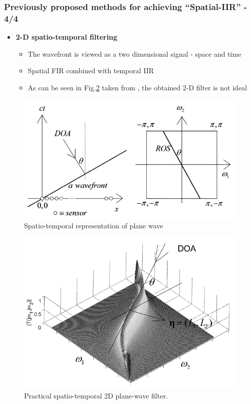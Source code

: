 \documentclass[10pt,pdflatex,headrule,landscape]{beamer}
\begin{document}
\begin{frame}
\frametitle{Previously proposed methods for achieving ``Spatial-IIR'' - 4/4}
\begin{minipage}{0.55\textwidth}
\begin{itemize}
\item
{
\textbf{2-D spatio-temporal filtering}
\begin{itemize}
\item{The wavefront is viewed as a two dimensional signal - space and time}
\item{Spatial FIR combined with temporal IIR}
\item{As can be seen in Fig.\ref{fig:SpatioTemporalPlaneWavePracticalFilter} taken from \cite{Bruton2003Three-dimensionalBanks}, the obtained 2-D filter is not ideal}
\end{itemize}
}
\end{itemize}
\end{minipage}
\begin{minipage}{0.44\textwidth}
\begin{figure}
\includegraphics[width=\textwidth]{Media/SpatioTemporalPlaneWave.PNG}
\caption{\tiny{Spatio-temporal representation of plane wave}}
\label{fig:SpatioTemporalPlaneWave}
\end{figure}
\begin{figure}
\includegraphics[width=.6\textwidth]{Media/SpatioTemporalPlaneWavePracticalFilter.PNG}
\caption{\tiny{Practical spatio-temporal 2D plane-wave filter.}}
\label{fig:SpatioTemporalPlaneWavePracticalFilter}
\end{figure}
\end{minipage}
\end{frame}
\end{document}
